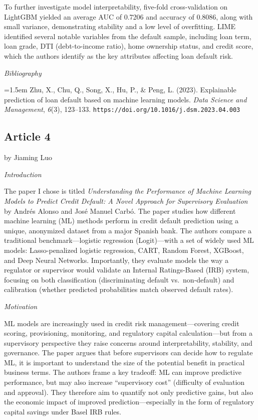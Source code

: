 \documentclass[letterpaper]{article}
\begin{document}
	To further investigate model interpretability, five-fold cross-validation on LightGBM yielded an average AUC of 0.7206 and accuracy of 0.8086, along with small variance, demonstrating stability and a low level of overfitting. LIME identified several notable variables from the default sample, including loan term, loan grade, DTI (debt-to-income ratio), home ownership status, and credit score, which the authors identify as the key attributes affecting loan default risk.
	
	\medskip
	
	\textit{Bibliography}
	
	\hangindent=1.5em
	Zhu, X., Chu, Q., Song, X., Hu, P., \& Peng, L. (2023). Explainable prediction of loan default based on machine learning models. \textit{Data Science and Management}, \textit{6}(3), 123--133. \texttt{https://doi.org/10.1016/j.dsm.2023.04.003}
	
	
	\subsection{Article 4}
	
	{\color{deepred} by Jiaming Luo}

	
	\textit{Introduction}
	
	The paper I chose is titled \textit{Understanding the Performance of Machine Learning Models to Predict Credit Default: A Novel Approach for Supervisory Evaluation} by Andr\'{e}s Alonso and Jos\'{e} Manuel Carb\'{o}. The paper studies how different machine learning (ML) methods perform in credit default prediction using a unique, anonymized dataset from a major Spanish bank. The authors compare a traditional benchmark---logistic regression (Logit)---with a set of widely used ML models: Lasso-penalized logistic regression, CART, Random Forest, XGBoost, and Deep Neural Networks. Importantly, they evaluate models the way a regulator or supervisor would validate an Internal Ratings-Based (IRB) system, focusing on both classification (discriminating default vs.\ non-default) and calibration (whether predicted probabilities match observed default rates).
	
	\medskip
	
	\textit{Motivation}
	
	ML models are increasingly used in credit risk management---covering credit scoring, provisioning, monitoring, and regulatory capital calculation---but from a supervisory perspective they raise concerns around interpretability, stability, and governance. The paper argues that before supervisors can decide how to regulate ML, it is important to understand the size of the potential benefit in practical business terms. The authors frame a key tradeoff: ML can improve predictive performance, but may also increase ``supervisory cost'' (difficulty of evaluation and approval). They therefore aim to quantify not only predictive gains, but also the economic impact of improved prediction---especially in the form of regulatory capital savings under Basel IRB rules.
	
\end{document}
